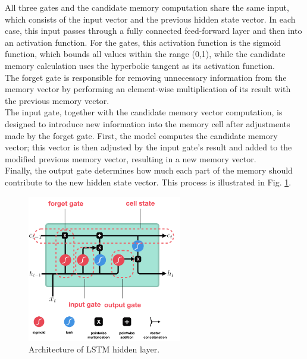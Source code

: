 All three gates and the candidate memory computation share the same input, which consists of the input vector and the previous hidden state vector. In each case, this input passes through a fully connected feed-forward layer and then into an activation function. For the gates, this activation function is the sigmoid function, which bounds all values within the range (0,1), while the candidate memory calculation uses the hyperbolic tangent as its activation function.
\\

The forget gate is responsible for removing unnecessary information from the memory vector by performing an element-wise multiplication of its result with the previous memory vector.
\\

The input gate, together with the candidate memory vector computation, is designed to introduce new information into the memory cell after adjustments made by the forget gate. First, the model computes the candidate memory vector; this vector is then adjusted by the input gate's result and added to the modified previous memory vector, resulting in a new memory vector.
\\

Finally, the output gate determines how much each part of the memory should contribute to the new hidden state vector. This process is illustrated in Fig. \ref{fig:lstm_arch}.

\begin{figure}[!h]
	\centering
	
	\includegraphics[width=0.6\textwidth]{images/LSTM_arch.png}
	
	\caption{Architecture of LSTM hidden layer.}
	\label{fig:lstm_arch}
\end{figure}
\newpage

